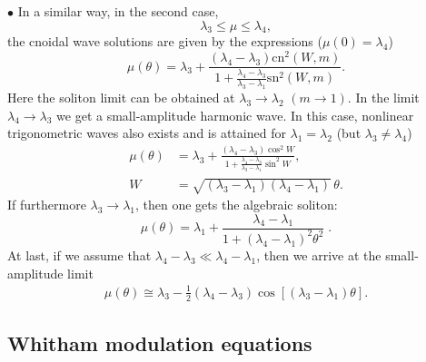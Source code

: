 \documentclass[pre,aps,superscriptaddress,twocolumn,floatfix]{revtex4-1}
\newcommand{\la}{\lambda}
\newcommand{\sn}{\mathrm{sn}}
\newcommand{\cn}{\mathrm{cn}}
\begin{document}
$\bullet$ In a similar way, in the second case,
\begin{equation}\label{eq22a}
\la_3\leq\mu\leq\la_4,
\end{equation}
the cnoidal wave solutions are given by the expressions ($\mu(0)=\la_4$)
\begin{equation}\label{eq23}
\mu(\theta)=\la_3+\frac{(\la_4-\la_3)
	\cn^2\left(W,m\right)}
{1+\frac{\la_4-\la_3}{\la_3-\la_1}
	\sn^2\left(W, m \right)}.
\end{equation}
Here the soliton limit can be obtained at $\la_3\to\la_2$ $(m\to1)$.
In the limit
$\la_4\to\la_3$ we get a small-amplitude harmonic wave.
In this case, nonlinear trigonometric waves also exists
and is attained for $\la_1=\la_2$ (but $\la_3\neq\la_4$)
\begin{equation}\label{eq24}
\begin{split}
\mu(\theta)&=\la_3+\frac{(\la_4-\la_3)\cos^2W}{1+\frac{\la_4-\la_3}{\la_3-\la_1}\sin^2W},\\
W&=\sqrt{(\la_3-\la_1)(\la_4-\la_1)}\,\theta.
\end{split}
\end{equation}
If furthermore $\la_3\to\la_1$, then one gets the algebraic
soliton:
\begin{equation}\label{alg-sol}
\mu(\theta)=\la_1+\frac{\la_4-\la_1}{1+(\la_4-\la_1)^2\theta^2}\; .
\end{equation}
At last, if we assume that $\la_4-\la_3\ll\la_4-\la_1$, then we arrive at
the small-amplitude limit
\begin{equation}\label{equ24}
\begin{split}
\mu(\theta)\cong \la_3-\frac12(\la_4-\la_3)\cos[(\la_3-\la_1)\theta].
\end{split}
\end{equation}


\subsection{Whitham modulation equations}
\end{document}
